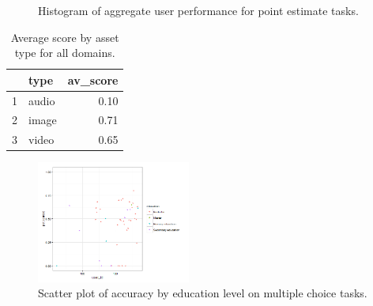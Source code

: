 \documentclass[12pt]{article}
\begin{document}
\begin{figure}[ht!]
     \begin{center}
    \end{center}
    \caption{Histogram of aggregate user performance for point estimate tasks.}
\end{figure}


\begin{table}[ht!]
\centering
\begin{tabular}{rlr}
  \hline
 & type & av\_score \\ 
  \hline
1 & audio & 0.10 \\ 
  2 & image & 0.71 \\ 
  3 & video & 0.65 \\ 
   \hline
\end{tabular}
\caption{Average score by asset type for all domains.} 
\end{table}

\begin{figure}[ht!]
\begin{center}
\includegraphics[width=0.45\textwidth]{../../output/demo_analysis/scatter_edu.png}
\caption{Scatter plot of accuracy by education level on multiple choice tasks.}
\end{center}	
\end{figure}
\end{document}
